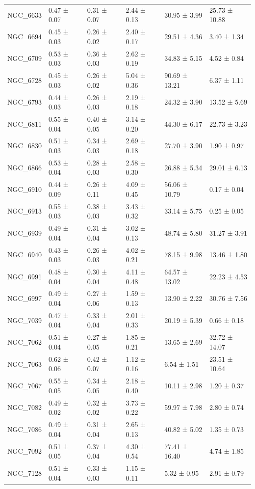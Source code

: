 \begin{tabular}{llllll}
NGC_6633 & 0.47 ± 0.07 & 0.31 ± 0.07 & 2.44 ± 0.13 & 30.95 ± 3.99 & 25.73 ± 10.88 \\
NGC_6694 & 0.45 ± 0.03 & 0.26 ± 0.02 & 2.40 ± 0.17 & 29.51 ± 4.36 & 3.40 ± 1.34 \\
NGC_6709 & 0.53 ± 0.03 & 0.36 ± 0.03 & 2.62 ± 0.19 & 34.83 ± 5.15 & 4.52 ± 0.84 \\
NGC_6728 & 0.45 ± 0.03 & 0.26 ± 0.02 & 5.04 ± 0.36 & 90.69 ± 13.21 & 6.37 ± 1.11 \\
NGC_6793 & 0.44 ± 0.03 & 0.26 ± 0.03 & 2.19 ± 0.18 & 24.32 ± 3.90 & 13.52 ± 5.69 \\
NGC_6811 & 0.55 ± 0.04 & 0.40 ± 0.05 & 3.14 ± 0.20 & 44.30 ± 6.17 & 22.73 ± 3.23 \\
NGC_6830 & 0.51 ± 0.03 & 0.34 ± 0.03 & 2.69 ± 0.18 & 27.70 ± 3.90 & 1.90 ± 0.97 \\
NGC_6866 & 0.53 ± 0.04 & 0.28 ± 0.03 & 2.58 ± 0.30 & 26.88 ± 5.34 & 29.01 ± 6.13 \\
NGC_6910 & 0.44 ± 0.09 & 0.26 ± 0.11 & 4.09 ± 0.45 & 56.06 ± 10.79 & 0.17 ± 0.04 \\
NGC_6913 & 0.55 ± 0.03 & 0.38 ± 0.03 & 3.43 ± 0.32 & 33.14 ± 5.75 & 0.25 ± 0.05 \\
NGC_6939 & 0.49 ± 0.04 & 0.31 ± 0.04 & 3.02 ± 0.13 & 48.74 ± 5.80 & 31.27 ± 3.91 \\
NGC_6940 & 0.43 ± 0.03 & 0.26 ± 0.03 & 4.02 ± 0.21 & 78.15 ± 9.98 & 13.46 ± 1.80 \\
NGC_6991 & 0.48 ± 0.04 & 0.30 ± 0.04 & 4.11 ± 0.48 & 64.57 ± 13.02 & 22.23 ± 4.53 \\
NGC_6997 & 0.49 ± 0.04 & 0.27 ± 0.06 & 1.59 ± 0.13 & 13.90 ± 2.22 & 30.76 ± 7.56 \\
NGC_7039 & 0.47 ± 0.04 & 0.33 ± 0.04 & 2.01 ± 0.33 & 20.19 ± 5.39 & 0.66 ± 0.18 \\
NGC_7062 & 0.51 ± 0.04 & 0.27 ± 0.05 & 1.85 ± 0.21 & 13.65 ± 2.69 & 32.72 ± 14.07 \\
NGC_7063 & 0.62 ± 0.06 & 0.42 ± 0.07 & 1.12 ± 0.16 & 6.54 ± 1.51 & 23.51 ± 10.64 \\
NGC_7067 & 0.55 ± 0.05 & 0.34 ± 0.05 & 2.18 ± 0.40 & 10.11 ± 2.98 & 1.20 ± 0.37 \\
NGC_7082 & 0.49 ± 0.02 & 0.32 ± 0.02 & 3.73 ± 0.22 & 59.97 ± 7.98 & 2.80 ± 0.74 \\
NGC_7086 & 0.49 ± 0.04 & 0.31 ± 0.04 & 2.65 ± 0.13 & 40.82 ± 5.02 & 1.35 ± 0.73 \\
NGC_7092 & 0.51 ± 0.05 & 0.37 ± 0.04 & 4.30 ± 0.54 & 77.41 ± 16.40 & 4.74 ± 1.85 \\
NGC_7128 & 0.51 ± 0.04 & 0.33 ± 0.03 & 1.15 ± 0.11 & 5.32 ± 0.95 & 2.91 ± 0.79 \\

\end{tabular}
